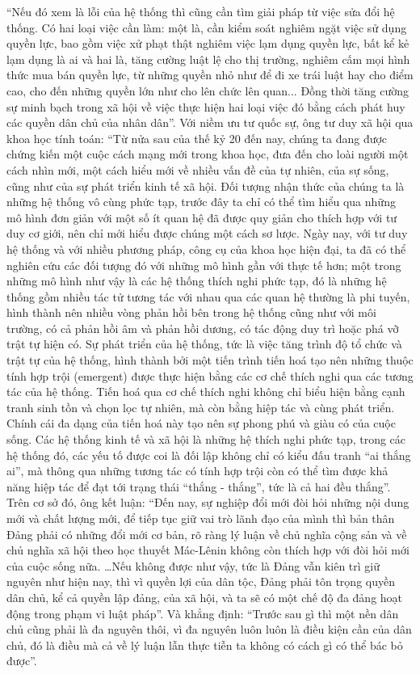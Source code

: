 “Nếu đó xem là lỗi của hệ thống thì cũng cần tìm giải pháp từ việc sửa đổi hệ thống. Có hai loại việc cần làm: một là, cần kiểm soát nghiêm ngặt việc sử dụng quyền lực, bao gồm việc xử phạt thật nghiêm việc lạm dụng quyền lực, bất kể kẻ lạm dụng là ai và hai là, tăng cường luật lệ cho thị trường, nghiêm cấm mọi hình thức mua bán quyền lực, từ những quyền nhỏ như để đi xe trái luật hay cho điểm cao, cho đến những quyền lớn như cho lên chức lên quan... Đồng thời tăng cường sự minh bạch trong xã hội về việc thực hiện hai loại việc đó bằng cách phát huy các quyền dân chủ của nhân dân”.
Với niềm ưu tư quốc sự, ông tư duy xã hội qua khoa học tính toán:
“Từ nửa sau của thế kỷ 20 đến nay, chúng ta đang được chứng kiến một cuộc cách mạng mới trong khoa học, đưa đến cho loài người một cách nhìn mới, một cách hiểu mới về nhiều vấn đề của tự nhiên, của sự sống, cũng như của sự phát triển kinh tế xã hội. Đối tượng nhận thức của chúng ta là những hệ thống vô cùng phức tạp, trước đây ta chỉ có thể tìm hiểu qua những mô hình đơn giản với một số ít quan hệ đã được quy giản cho thích hợp với tư duy cơ giới, nên chỉ mới hiểu được chúng một cách sơ lược. Ngày nay, với tư duy hệ thống và với nhiều phương pháp, công cụ của khoa học hiện đại, ta đã có thể nghiên cứu các đối tượng đó với những mô hình gần với thực tế hơn; một trong những mô hình như vậy là các hệ thống thích nghi phức tạp, đó là những hệ thống gồm nhiều tác tử tương tác với nhau qua các quan hệ thường là phi tuyến, hình thành nên nhiều vòng phản hồi bên trong hệ thống cũng như với môi trường, có cả phản hồi âm và phản hồi dương, có tác động duy trì hoặc phá vỡ trật tự hiện có. Sự phát triển của hệ thống, tức là việc tăng trình độ tổ chức và trật tự của hệ thống, hình thành bởi một tiến trình tiến hoá tạo nên những thuộc tính hợp trội (emergent) được thực hiện bằng các cơ chế thích nghi qua các tương tác của hệ thống. Tiến hoá qua cơ chế thích nghi không chỉ biểu hiện bằng cạnh tranh sinh tồn và chọn lọc tự nhiên, mà còn bằng hiệp tác và cùng phát triển. Chính cái đa dạng của tiến hoá này tạo nên sự phong phú và giàu có của cuộc sống. Các hệ thống kinh tế và xã hội là những hệ thích nghi phức tạp, trong các hệ thống đó, các yếu tố được coi là đối lập không chỉ có kiểu đấu tranh “ai thắng ai”, mà thông qua những tương tác có tính hợp trội còn có thể tìm được khả năng hiệp tác để đạt tới trạng thái “thắng - thắng”, tức là cả hai đều thắng”.
Trên cơ sở đó, ông kết luận:
“Đến nay, sự nghiệp đổi mới đòi hỏi những nội dung mới và chất lượng mới, để tiếp tục giữ vai trò lãnh đạo của mình thì bản thân Đảng phải có những đổi mới cơ bản, rõ ràng lý luận về chủ nghĩa cộng sản và về chủ nghĩa xã hội theo học thuyết Mác-Lênin không còn thích hợp với đòi hỏi mới của cuộc sống nữa. …Nếu không được như vậy, tức là Đảng vẫn kiên trì giữ nguyên như hiện nay, thì vì quyền lợi của dân tộc, Đảng phải tôn trọng quyền dân chủ, kể cả quyền lập đảng, của xã hội, và ta sẽ có một chế độ đa đảng hoạt động trong phạm vi luật pháp”.
Và khẳng định:
“Trước sau gì thì một nền dân chủ cũng phải là đa nguyên thôi, vì đa nguyên luôn luôn là điều kiện cần của dân chủ, đó là điều mà cả về lý luận lẫn thực tiễn ta không có cách gì có thể bác bỏ được”.

